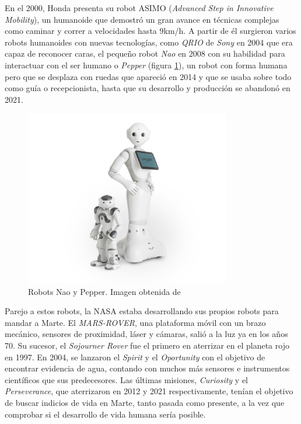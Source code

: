 En el 2000, Honda presenta su robot ASIMO (\textit{Advanced Step in Innovative Mobility}), un humanoide que demostró un gran avance en técnicas
complejas como caminar y correr a velocidades hasta 9km/h.
A partir de él surgieron varios robots humanoides con nuevas tecnologías,
como \textit{QRIO} de \textit{Sony} en 2004 que era capaz de reconocer caras, el pequeño robot \textit{Nao} en 2008 con su habilidad para
interactuar con el ser humano o \textit{Pepper} (figura \ref{fig:nao_pepper}), un robot con forma humana pero que se desplaza con ruedas que apareció en 2014 y que se usaba sobre todo
como guía o recepcionista, hasta que su desarrollo y producción se abandonó en 2021.

\begin{figure} [H]
  \begin{center}
    \includegraphics[width=9cm]{figs/c1/nao-pepper.png}
  \end{center}
  \caption[Robots Nao y Pepper]{Robots Nao y Pepper. Imagen obtenida de \cite{nao_pepper}}
  \label{fig:nao_pepper}
\end{figure}

Parejo a estos robots, la NASA estaba desarrollando sus propios robots para mandar a Marte. El \textit{MARS-ROVER}, una plataforma móvil con un brazo mecánico,
sensores de proximidad, láser y cámaras, salió a la luz ya en los años 70. Su sucesor, el \textit{Sojourner Rover} fue el primero en aterrizar en el
planeta rojo en 1997. En 2004, se lanzaron el \textit{Spirit} y el \textit{Oportunity} con el objetivo de encontrar evidencia de agua, contando con muchos
más sensores e instrumentos científicos que sus predecesores. Las últimas misiones, \textit{Curiosity} y el \textit{Perseverance}, que aterrizaron en
2012 y 2021 respectivamente, tenían el objetivo de buscar indicios de vida en Marte, tanto pasada como presente, a la vez que comprobar si el desarrollo
de vida humana sería posible.

